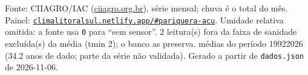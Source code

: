 \documentclass[10pt,a4paper]{article}
\begin{document}
\vspace{1pt}
{\tiny\color{cinza}
Fonte: CIIAGRO/IAC (\href{http://ciiagro.org.br}{ciiagro.org.br}), série mensal;
chuva é o total do mês. Painel:
\href{https://climalitoralsul.netlify.app/\#pariquera-acu}%
{\texttt{climalitoralsul.netlify.app/\#pariquera-acu}}.
Umidade relativa omitida: a fonte usa \texttt{0} para ``sem sensor''.  2 leitura(s) fora da faixa de sanidade excluída(s) da média (tmin 2); o banco as preserva.
médias do período 1992\textendash{}2026 (34.2 anos de dado; parte da série não validada).
Gerado a partir de \texttt{dados.json} de 2026-11-06.}
\end{document}
